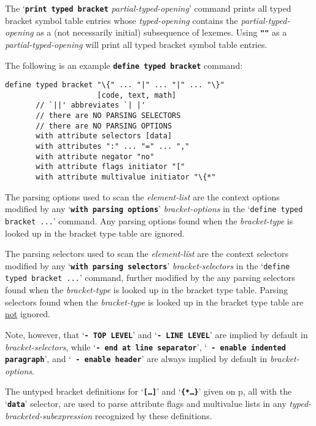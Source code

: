 \documentclass[12pt]{article}
\newcommand{\TT}[1]{{\tt \bfseries #1}}
\newcommand{\pagref}[1]{p\pageref{#1}}
\newenvironment{indpar}[1][0.3in]%
	{\begin{list}{}%
		     {\setlength{\itemsep}{0in}%
		      \setlength{\topsep}{0in}%
		      \setlength{\parsep}{1ex}%
		      \setlength{\labelwidth}{#1}%
		      \setlength{\leftmargin}{#1}%
		      \addtolength{\leftmargin}{\labelsep}}%
	 \item}%
	{\end{list}}
\begin{document}
The `\TT{print typed bracket} {\em partial-typed-opening}' command
prints all typed bracket symbol table entries whose
{\em typed-opening} contains the {\em partial-typed-opening}
as a (not necessarily initial) subsequence of lexemes.  Using \TT{""} as
a {\em partial-typed-opening} will print all typed bracket
symbol table entries.

The following is an example \TT{define typed bracket} command:
\begin{indpar}\begin{verbatim}
define typed bracket "\{" ... "|" ... "|" ... "\}"
                     [code, text, math]
       // `||' abbreviates `| |'
       // there are NO PARSING SELECTORS
       // there are NO PARSING OPTIONS
       with attribute selectors [data]
       with attributes ":" ... "=" ... ","
       with attribute negator "no"
       with attribute flags initiator "["
       with attribute multivalue initiator "\{*"
\end{verbatim}\end{indpar}

The parsing options used
to scan the {\em element-list} are the context options
modified by any `\TT{with parsing options}' {\em bracket-options}
in the `{\tt define typed bracket ...}' command.
Any parsing options
found when the {\em bracket-type} is looked up in the
bracket type table are ignored.

The parsing selectors used
to scan the {\em element-list} are the context selectors
modified by any `\TT{with parsing selectors}' {\em bracket-selectors}
in the `{\tt define typed bracket ...}' command,
further modified by the any parsing selectors
found when the {\em bracket-type} is looked up in the
bracket type table.
Parsing selectors
found when the {\em bracket-type} is looked up in the
bracket type table are \underline{not} ignored.

Note, however, that `\TT{- TOP LEVEL}' and `\TT{- LINE LEVEL}' are
implied by default in {\em bracket-selectors}, while
`\TT{- end at line separator}',
`\TT{ - enable indented paragraph}', and
`\TT{ - enable header}' are always implied by default in
{\em bracket-options}.

The untyped bracket definitions for `\TT{[\ldots]}' and
`\TT{\{*\ldots*\}}' given on \pagref{UNTYPED-BRACKET-BUILTINS},
all with the `\TT{data}' selector, are used to parse
attribute flags and multivalue lists in any
{\em typed-bracketed-subexpression} recognized by these definitions.
\end{document}
